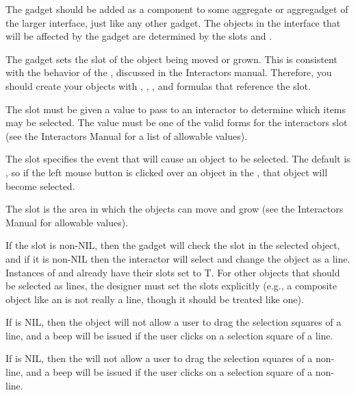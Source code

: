 The  gadget should be added as a component to
some aggregate or aggregadget of the larger interface, just like any
other gadget.  The objects in the interface that will be affected by the
 gadget are determined by the slots
 and .

The  gadget sets the  slot of the object
being moved or grown.  This is consistent with the behavior of the
, discussed in the Interactors manual.  Therefore,
you should create your objects with , , , and
 formulas that reference the  slot.

The  slot must be given a value to pass to an
interactor to determine which items may be selected.  The value must
be one of the valid  forms for the interactors
 slot (see the Interactors Manual for a list of
allowable values).

The  slot specifies the event that will cause an object
to be selected.  The default is , so if the left mouse button
is clicked over an object in the , that object will
become selected.

The  slot is the area in which the objects can move
and grow (see the Interactors Manual for allowable values).

If the  slot is non-NIL, then the
 gadget will check the  slot in the
selected object, and if it is non-NIL then the interactor will select
and change the object as a line.  Instances of  and
 already have their  slots set to T.
For other objects that should be selected as lines, the designer must set the
 slots explicitly (e.g., a composite object like an
 is not really a line, though it should be treated like one).

If  is NIL, then the 
object will not allow a user to drag the selection squares of a line,
and a beep will be issued if the user clicks on a selection square of
a line.

If  is NIL, then the  will not allow a user to drag the selection squares of a
non-line, and a beep will be issued if the user clicks on a selection
square of a non-line.

